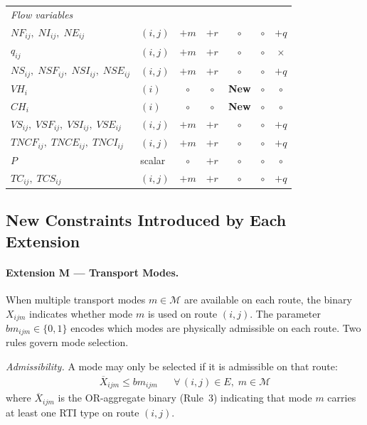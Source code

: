 \begin{longtable}{llccccc}
\multicolumn{7}{l}{\textit{Flow variables}} \\
$NF_{ij},\;NI_{ij},\;NE_{ij}$
  & $(i,j)$
  & $+m$ & $+r$ & $\circ$ & $\circ$ & $+q$ \\
$q_{ij}$
  & $(i,j)$
  & $+m$ & $+r$ & $\circ$ & $\circ$ & $\times$ \\
$NS_{ij},\;NSF_{ij},\;NSI_{ij},\;NSE_{ij}$
  & $(i,j)$
  & $+m$ & $+r$ & $\circ$ & $\circ$ & $+q$ \\
$VH_{i}$
  & $(i)$
  & $\circ$ & $\circ$ & \textbf{New} & $\circ$ & $\circ$ \\[4pt]
$CH_{i}$
  & $(i)$
  & $\circ$ & $\circ$ & \textbf{New} & $\circ$ & $\circ$ \\[4pt]
$VS_{ij},\;VSF_{ij},\;VSI_{ij},\;VSE_{ij}$
  & $(i,j)$
  & $+m$ & $+r$ & $\circ$ & $\circ$ & $+q$ \\
$TNCF_{ij},\;TNCE_{ij},\;TNCI_{ij}$
  & $(i,j)$
  & $+m$ & $+r$ & $\circ$ & $\circ$ & $+q$ \\
$P$
  & scalar
  & $\circ$ & $+r$ & $\circ$ & $\circ$ & $\circ$ \\
$TC_{ij},\;TCS_{ij}$
  & $(i,j)$
  & $+m$ & $+r$ & $\circ$ & $\circ$ & $+q$ \\[4pt]
\end{longtable}


\subsection{New Constraints Introduced by Each Extension}
\label{sec:ext-new-constraints}

\paragraph{Extension M --- Transport Modes.}
{When multiple transport modes $m \in \mathcal{M}$ are
available on each route, the binary $X_{ijm}$ indicates whether mode $m$ is
used on route $(i,j)$.  The parameter $bm_{ijm} \in \{0,1\}$ encodes which
modes are physically admissible on each route.  Two rules govern mode
selection.}

\noindent\textit{{Admissibility.}}
{A mode may only be selected if it is admissible on that route:}
%
\begin{align}
  \overline{X}_{ijm} \leq bm_{ijm}
  && \forall\,(i,j)\in E,\;{m\in\mathcal{M}}
  \label{eq:ext-m-or}
\end{align}
%
{where $\overline{X}_{ijm}$ is the OR-aggregate binary
(Rule~3) indicating that mode $m$ carries at least one RTI type on route
$(i,j)$.}

